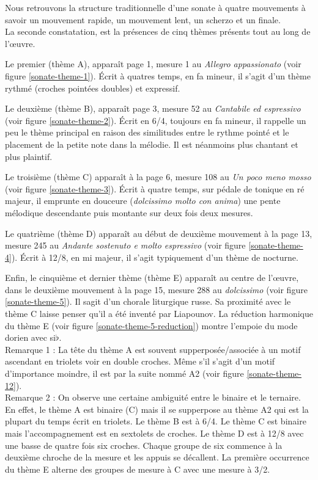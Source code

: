 Nous retrouvons la structure traditionnelle d'une sonate à quatre mouvements à savoir un mouvement rapide, un mouvement lent, un scherzo et un finale.\\

La seconde constatation, est la présences de cinq thèmes présents tout au long de l'œuvre.

Le premier (thème A), apparaît page 1, mesure 1 au \emph{Allegro appassionato} (voir figure \ref{sonate-theme-1}). Écrit à quatres temps, en fa mineur, il s'agit d'un thème rythmé (croches pointées doubles) et expressif.

Le deuxième (thème B), apparaît page 3, mesure 52 au \emph{Cantabile ed espressivo} (voir figure \ref{sonate-theme-2}). Écrit en 6/4, toujours en fa mineur, il rappelle un peu le thème principal en raison des similitudes entre le rythme pointé et le placement de la petite note dans la mélodie. Il est néanmoins plus chantant et plus plaintif.

Le troisième (thème C) apparaît à la page 6, mesure 108 au \emph{Un poco meno mosso} (voir figure \ref{sonate-theme-3}). Écrit à quatre temps, sur pédale de tonique en ré majeur, il emprunte en douceure (\emph{dolcissimo molto con anima}) une pente mélodique descendante puis montante sur deux fois deux mesures.

Le quatrième (thème D) apparaît au début de deuxième mouvement à la page 13, mesure 245 au \emph{Andante sostenuto e molto espressivo} (voir figure \ref{sonate-theme-4}). Écrit à 12/8, en mi majeur, il s'agit typiquement d'un thème de nocturne.

Enfin, le cinquième et dernier thème (thème E) apparaît au centre de l'œuvre, dans le deuxième mouvement à la page 15, mesure 288 au \emph{dolcissimo} (voir figure \ref{sonate-theme-5}). Il sagit d'un chorale liturgique russe. Sa proximité avec le thème C laisse penser qu'il a été inventé par Liapounov. La réduction harmonique du thème E (voir figure \ref{sonate-theme-5-reduction}) montre l'empoie du mode dorien avec si$\flat$.\\

Remarque 1 : La tête du thème A est souvent supperposée/associée à un motif ascendant en triolets voir en double croches. Même s'il s'agit d'un motif d'importance moindre, il est par la suite nommé A2 (voir figure \ref{sonate-theme-12}).\\

Remarque 2 : On observe une certaine ambiguité entre le binaire et le ternaire. En effet, le thème A est binaire (C) mais il se supperpose au thème A2 qui est la plupart du temps écrit en triolets. Le thème B est à 6/4. Le thème C est binaire mais l'accompagnement est en sextolets de croches. Le thème D est à 12/8 avec une basse de quatre fois six croches. Chaque groupe de six commence à la deuxième chroche de la mesure et les appuis se décallent. La première occurrence du thème E alterne des groupes de mesure à C avec une mesure à 3/2.\\

